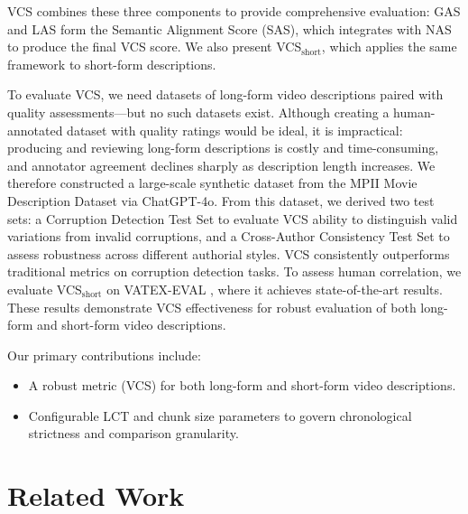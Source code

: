 \documentclass[letterpaper]{article} %
\begin{document}
VCS combines these three components to provide comprehensive evaluation: GAS and LAS form the Semantic Alignment Score (SAS), which integrates with NAS to produce the final VCS score. We also present VCS$_{\text{short}}$, which applies the same framework to short-form descriptions.

To evaluate VCS, we need datasets of long-form video descriptions paired with quality assessments—but no such datasets exist. Although creating a human-annotated dataset with quality ratings would be ideal, it is impractical: producing and reviewing long-form descriptions is costly and time-consuming, and annotator agreement declines sharply as description length increases. We therefore constructed a large-scale synthetic dataset from the MPII Movie Description Dataset \citep{rohrbach2015dataset} via ChatGPT-4o. From this dataset, we derived two test sets: a Corruption Detection Test Set to evaluate VCS ability to distinguish valid variations from invalid corruptions, and a Cross-Author Consistency Test Set to assess robustness across different authorial styles. VCS consistently outperforms traditional metrics on corruption detection tasks. To assess human correlation, we evaluate VCS$_{\text{short}}$ on VATEX-EVAL \citep{syxl:22}, where it achieves state-of-the-art results. These results demonstrate VCS effectiveness for robust evaluation of both long-form and short-form video descriptions.

Our primary contributions include:
\begin{itemize}
\item A robust metric (VCS) for both long-form and short-form video descriptions.
\item Configurable LCT and chunk size parameters to govern chronological strictness and comparison granularity.
\end{itemize}

\section{Related Work}
\end{document}
